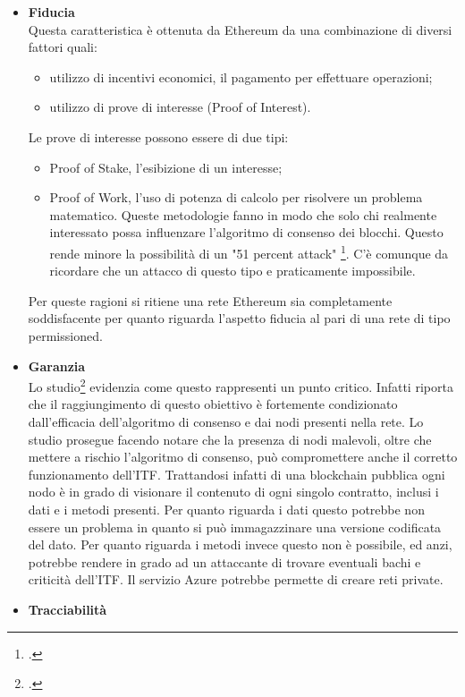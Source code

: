\begin{itemize}
    \item \textbf{Fiducia} \\
    Questa caratteristica è ottenuta da Ethereum da una combinazione di diversi fattori quali:
    \begin{itemize}
        \item utilizzo di incentivi economici, il pagamento per effettuare operazioni;
        \item utilizzo di prove di interesse (Proof of Interest).
    \end{itemize}
    Le prove di interesse possono essere di due tipi:
    \begin{itemize}
        \item Proof of Stake, l’esibizione di un interesse;
        \item Proof of Work, l’uso di potenza di calcolo per risolvere un problema matematico.
        Queste metodologie fanno in modo che solo chi realmente interessato possa influenzare l’algoritmo di consenso dei blocchi. Questo rende minore la possibilità di un "51 percent attack" \footcite{site:51-attack}. C’è comunque da ricordare che un attacco di questo tipo e praticamente impossibile.
    \end{itemize}
    Per queste ragioni si ritiene una rete Ethereum sia completamente soddisfacente per quanto riguarda l’aspetto fiducia al pari di una rete di tipo permissioned.
    \item \textbf{Garanzia}\\
    Lo studio\footcite{farah:The-Dawn-of-Decentralized-Identity} evidenzia come questo rappresenti un punto critico. Infatti riporta che il raggiungimento di questo obiettivo è fortemente condizionato dall’efficacia dell’algoritmo di consenso e dai nodi presenti nella rete. Lo studio prosegue facendo notare che la presenza di nodi malevoli, oltre che mettere a rischio l’algoritmo di consenso, può compromettere anche il corretto funzionamento dell’ITF. Trattandosi infatti di una blockchain pubblica ogni nodo è in grado di visionare il contenuto di ogni singolo contratto, inclusi i dati e i metodi presenti. Per quanto riguarda i dati questo potrebbe non essere un problema in quanto si può immagazzinare una versione codificata del dato. Per quanto riguarda i metodi invece questo non è possibile, ed anzi, potrebbe rendere in grado ad un attaccante di trovare eventuali bachi e criticità dell’ITF. Il servizio Azure potrebbe permette di creare reti private.
    \item \textbf{Tracciabilità}\\

\end{itemize}

